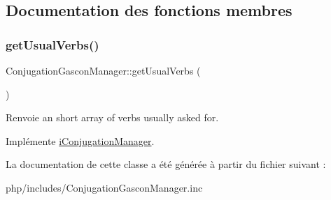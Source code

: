 \subsection{Documentation des fonctions membres}
\hypertarget{classConjugationGasconManager_a4117ecff48a5baa29d894f6174d88983}{}\label{classConjugationGasconManager_a4117ecff48a5baa29d894f6174d88983} 
\subsubsection{\texorpdfstring{get\+Usual\+Verbs()}{getUsualVerbs()}}
{\footnotesize\ttfamily Conjugation\+Gascon\+Manager\+::get\+Usual\+Verbs (\begin{DoxyParamCaption}{ }\end{DoxyParamCaption})}

\begin{DoxyReturn}{Renvoie}
an short array of verbs usually asked for. 
\end{DoxyReturn}


Implémente \hyperlink{interfaceiConjugationManager_a2a7ed39313c1c92ef5c01c88895de36e}{i\+Conjugation\+Manager}.



La documentation de cette classe a été générée à partir du fichier suivant \+:\begin{DoxyCompactItemize}
\item 
php/includes/Conjugation\+Gascon\+Manager.\+inc\end{DoxyCompactItemize}
